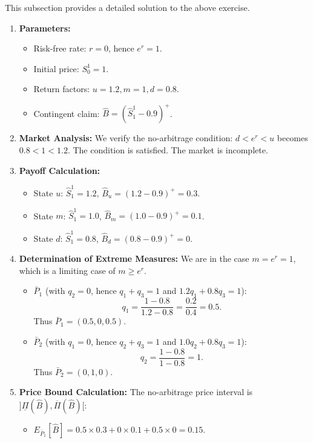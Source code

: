 This subsection provides a detailed solution to the above exercise.

\begin{enumerate}
    \item \textbf{Parameters:}
    \begin{itemize}
        \item Risk-free rate: $r=0$, hence $e^r = 1$.
        \item Initial price: $S_0^1 = 1$.
        \item Return factors: $u=1.2, m=1, d=0.8$.
        \item Contingent claim: $\hat{B} = (\hat{S}^1_1 - 0.9)^+$.
    \end{itemize}
    \item \textbf{Market Analysis:} We verify the no-arbitrage condition: $d < e^r < u$ becomes $0.8 < 1 < 1.2$. The condition is satisfied. The market is incomplete.
    \item \textbf{Payoff Calculation:}
    \begin{itemize}
        \item State $u$: $\hat{S}^1_1 = 1.2$, $\hat{B}_u = (1.2 - 0.9)^+ = 0.3$.
        \item State $m$: $\hat{S}^1_1 = 1.0$, $\hat{B}_m = (1.0 - 0.9)^+ = 0.1$.
        \item State $d$: $\hat{S}^1_1 = 0.8$, $\hat{B}_d = (0.8 - 0.9)^+ = 0$.
    \end{itemize}
    \item \textbf{Determination of Extreme Measures:} We are in the case $m = e^r = 1$, which is a limiting case of $m \ge e^r$.
    \begin{itemize}
        \item $\bar{P}_1$ (with $q_2=0$, hence $q_1+q_3=1$ and $1.2q_1 + 0.8q_3 = 1$):
        \[
        q_1 = \frac{1-0.8}{1.2-0.8} = \frac{0.2}{0.4} = 0.5.
        \]
        Thus $\bar{P}_1 = (0.5, 0, 0.5)$.
        \item $\bar{P}_2$ (with $q_1=0$, hence $q_2+q_3=1$ and $1.0q_2 + 0.8q_3 = 1$):
        \[
        q_2 = \frac{1-0.8}{1-0.8} = 1.
        \]
        Thus $\bar{P}_2 = (0, 1, 0)$.
    \end{itemize}
    \item \textbf{Price Bound Calculation:} The no-arbitrage price interval is $]\underline{\Pi}(\hat{B}), \overline{\Pi}(\hat{B})[$:
    \begin{itemize}
        \item $E_{\bar{P}_1}[\hat{B}] = 0.5 \times 0.3 + 0 \times 0.1 + 0.5 \times 0 = 0.15$.

\end{itemize}
\end{enumerate}
